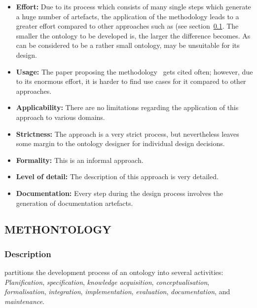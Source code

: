 \begin{itemize}
  \item \textbf{Effort:} Due to its process which consists of many single steps which generate a huge number of artefacts, the application of the  methodology leads to a greater effort compared to other approaches such as \methontology (see section~\ref{subsec:approach5}. The smaller the ontology to be developed is, the larger the difference becomes. As \thinkhomeweather can be considered to be a rather small ontology,  may be unsuitable for its design.
  
   \item \textbf{Usage:} The paper proposing the  methodology~\cite{SoftwareEngineeringOntology} gets cited often; however, due to its enormous effort, it is harder to find use cases for it compared to other approaches.

  \item \textbf{Applicability:} There are no limitations regarding the application of this approach to various domains.
  
  \item \textbf{Strictness:} The  approach is a very strict process, but nevertheless leaves some margin to the ontology designer for individual design decisions.
  
  \item \textbf{Formality:} This is an informal approach.
  
  \item \textbf{Level of detail:} The description of this approach is very detailed.
  
  \item \textbf{Documentation:} Every step during the design process involves the generation of documentation artefacts.
\end{itemize}

\subsection{METHONTOLOGY}
\label{subsec:approach5}

\subsubsection{Description}

\methontology partitions the development process of an ontology into several activities: \emph{Planification}, \emph{specification}, \emph{knowledge acquisition}, \emph{conceptualisation}, \emph{formalisation}, \emph{integration}, \emph{implementation}, \emph{evaluation}, \emph{documentation}, and \emph{maintenance}.

